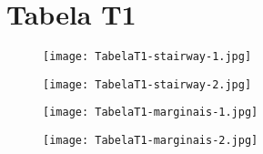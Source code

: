 \chapter{Tabela T1}


\begin{figure}[ht]
\begin{center}
\texttt{[image: TabelaT1-stairway-1.jpg]}
\end{center}
\end{figure}

\begin{figure}[ht]
\begin{center}
\texttt{[image: TabelaT1-stairway-2.jpg]}
\end{center}
\end{figure}

\begin{figure}[ht]
\begin{center}
\texttt{[image: TabelaT1-marginais-1.jpg]}
\end{center}
\end{figure}

\begin{figure}[ht]
\begin{center}
\texttt{[image: TabelaT1-marginais-2.jpg]}
\end{center}
\end{figure}
